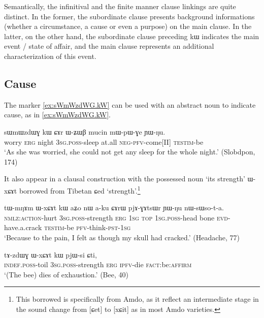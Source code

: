 \documentclass[oldfontcommands,oneside,a4paper,11pt]{article}
\newcommand{\ipa}[1]{{\phon #1}} %
\begin{document}
Semantically,  the infinitival and the finite manner clause linkings are quite distinct. In the former, the subordinate clause presents background informations (whether a circumstance, a cause or even a purpose) on the main clause. In the latter, on the other hand, the subordinate clause preceding \ipa{kɯ} indicates the main event / state of affair, and the main clause represents an additional characterization of this event.


\subsection{Cause} \label{sec:cause}

The marker \ref{ex:sWmWzdWG.kW} can be used with an abstract noun to indicate cause, as in \ref{ex:sWmWzdWG.kW}.

\begin{exe}
\ex \label{ex:sWmWzdWG.kW}
\gll 
\ipa{sɯmɯzdɯɣ}  	\ipa{kɯ}  	\ipa{ɕɤr}  	\ipa{ɯ-ʑɯβ}  	\ipa{mucin}  	\ipa{mɯ-pɯ-ɣe}  	\ipa{ɲɯ-ŋu.}  	 \\
worry \textsc{erg} night \textsc{3sg.poss}-sleep at.all \textsc{neg-pfv}-come[II] \textsc{testim}-be \\
\glt `As she was worried, she could not get any sleep for the whole night.' (Slobdpon, 174)
\end{exe}


  It also appear in a clausal construction with the possessed noun `its strength' \ipa{ɯ-xɕɤt} borrowed from Tibetan \ipa{ɕed} `strength'.\footnote{This borrowed is specifically from Amdo, as it reflect an intermediate stage in the sound change from [ɕet] to [xɕit] as in most Amdo varieties.}

 

\begin{exe}
\ex \label{ex:WxCAt.kW}
\gll
\ipa{tɯ-mŋɤm} 	\ipa{ɯ-xɕɤt} 	\ipa{kɯ} 	\ipa{aʑo} 	\ipa{nɯ} 	\ipa{a-ku} 	\ipa{ɕɤrɯ} 	\ipa{pjɤ-ɣɤtsɯr} 	\ipa{ɲɯ-ŋu} 	\ipa{nɯ-sɯso-t-a.} 	\\
\textsc{nmlz:action}-hurt \textsc{3sg.poss}-strength \textsc{erg} \textsc{1sg} \textsc{top} \textsc{1sg.poss}-head bone \textsc{evd}-have.a.crack \textsc{testim}-be \textsc{pfv}-think-\textsc{pst-1sg} \\
\glt `Because to the pain, I felt as though my skull had cracked.' (Headache, 77)
  \end{exe}

  \begin{exe}
\ex \label{ex:WxCAt.kW2}
\gll
  \ipa{tɤ-zdɯɣ} 	\ipa{ɯ-xɕɤt} 	\ipa{kɯ} 	\ipa{pjɯ-si} 	\ipa{ɕti,} \\
  \textsc{indef.poss}-toil  \textsc{3sg.poss}-strength \textsc{erg} \textsc{ipfv}-die \textsc{fact}:be:\textsc{affirm} \\
 \glt `(The bee) dies of exhaustion.' (Bee, 40)
  \end{exe}
  
\end{document}
